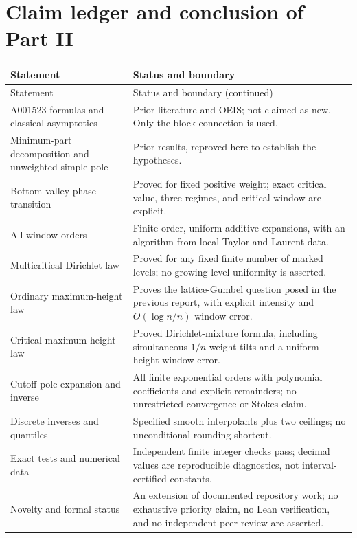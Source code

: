 \documentclass[11pt,a4paper]{article}
\numberwithin{equation}{section}
\theoremstyle{definition}\newtheorem{definition}[theorem]{Definition}
\theoremstyle{remark}\newtheorem{remark}[theorem]{Remark}
\begin{document}
\section{Claim ledger and conclusion of Part II}
\label{vmb:cw:sec:ledger}
\begin{longtable}{@{}>{\raggedright\arraybackslash}p{}>{\raggedright\arraybackslash}p{}@{}}
\toprule
Statement & Status and boundary\\
\midrule
\endfirsthead
\toprule
Statement & Status and boundary (continued)\\
\midrule
\endhead
A001523 formulas and classical asymptotics & Prior literature and OEIS;
not claimed as new. Only the block connection is used.\\[3pt]
Minimum-part decomposition and unweighted simple pole & Prior results,
reproved here to establish the hypotheses.\\[3pt]
Bottom-valley phase transition & Proved for fixed positive weight; exact
critical value, three regimes, and critical window are explicit.\\[3pt]
All window orders & Finite-order, uniform additive expansions, with an
algorithm from local Taylor and Laurent data.\\[3pt]
Multicritical Dirichlet law & Proved for any fixed finite number of marked
levels; no growing-level uniformity is asserted.\\[3pt]
Ordinary maximum-height law & Proves the lattice-Gumbel question posed in
the previous report, with explicit intensity and $O(\log n/n)$ window error.\\[3pt]
Critical maximum-height law & Proved Dirichlet-mixture formula, including
simultaneous $1/n$ weight tilts and a uniform height-window error.\\[3pt]
Cutoff-pole expansion and inverse & All finite exponential orders with
polynomial coefficients and explicit remainders; no unrestricted convergence
or Stokes claim.\\[3pt]
Discrete inverses and quantiles & Specified smooth interpolants plus two
ceilings; no unconditional rounding shortcut.\\[3pt]
Exact tests and numerical data & Independent finite integer checks pass;
decimal values are reproducible diagnostics, not interval-certified constants.\\[3pt]
Novelty and formal status & An extension of documented repository work;
no exhaustive priority claim, no Lean verification, and no independent peer
review are asserted.\\
\bottomrule
\end{longtable}
\end{document}
